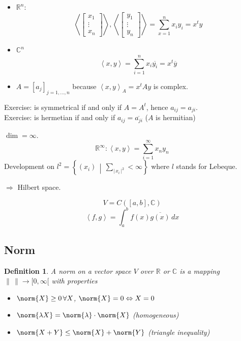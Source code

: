 \documentclass[a4paper,landscape,twocolumn]{article}
\newcommand\abs[1]{|\,#1\,|}
\newcommand\setdef[2]{\left\{#1\,\middle|\,#2\right\}}
\newcommand\functional[1]{\left\langle{#1}\right\rangle}
\newtheorem{defi}{Definition}
\DeclarePairedDelimiter\norm\lVert\rVert
\begin{document}
\begin{itemize}
  \item $\mathbb R^n$:
    \[
      \left\langle\begin{bmatrix} x_1 \\ \vdots \\ x_n \end{bmatrix}\right\rangle,
       \left\langle\begin{bmatrix} y_1 \\ \vdots \\ y_n \end{bmatrix}\right\rangle
       = \sum_{x=1}^n x_i y_i = x^t y
    \]
  \item $\mathbb C^n$
    \[ \functional{x,y} = \sum_{i=1}^n x_i \overline{y_i} = x^t \overline{y} \]
  \item
    $A = [a_j]_{j=1,\ldots,n}$ because $\functional{x,y}_A = x^t A y$ is complex.
\end{itemize}

Exercise: is symmetrical if and only if $A = A^t$, hence $a_{ij} = a_{ji}$. \\
Exercise: is hermetian if and only if $a_{ij} = \overline{a_{ji}}$ ($A$ is hermitian)


$\dim = \infty$.
\[ \mathbb R^\infty: \functional{x,y} = \sum_{i=1}^\infty x_n y_n \]
Development on $l^2 = \setdef{(x_i)}{\sum_{\abs{x_i}^2} < \infty}$
where $l$ stands for Lebeque.

$\Rightarrow$ Hilbert space.

\[ V = C([a,b], \mathbb C) \]
\[ \functional{f,g} = \int_a^b f(x) \overline{g(x)} \, dx \]

\subsection{Norm}
%
\begin{defi}
  \label{def-8.16}
  A \emph{norm} on a vector space $V$ over $\mathbb R$ or $\mathbb C$ is a mapping
  $\| \, \| \to [0,\infty[$ with properties
  \begin{itemize}
    \item[N1.] $\norm{X} \geq 0 \, \forall X$, $\norm{X} = 0 \Leftrightarrow X = 0$
    \item[N2.] $\norm{\lambda X} = \norm{\lambda} \cdot \norm{X}$ (homogeneous)
    \item[N3.] $\norm{X + Y} \leq \norm{X} + \norm{Y}$ (triangle inequality)
  \end{itemize}
\end{defi}
\end{document}
